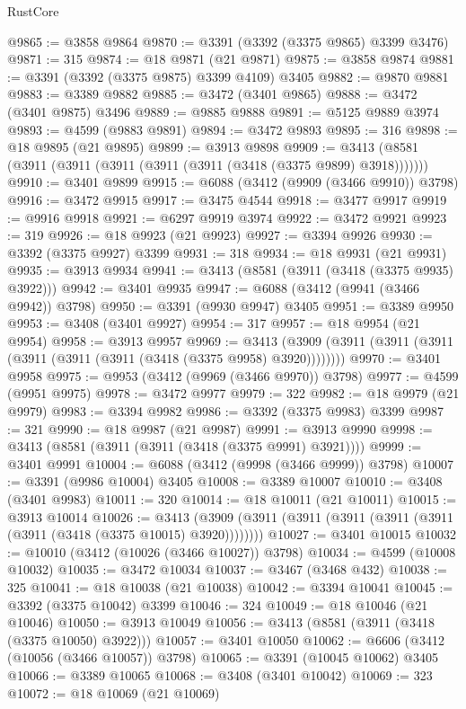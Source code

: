 \begin{lexlean}{RustCore}
\begin{coremodule}
@9865 := @3858 @9864
@9870 := @3391 (@3392 (@3375 @9865) @3399 @3476)
@9871 := 315
@9874 := @18 @9871 (@21 @9871)
@9875 := @3858 @9874
@9881 := @3391 (@3392 (@3375 @9875) @3399 @4109) @3405
@9882 := @9870 @9881
@9883 := @3389 @9882
@9885 := @3472 (@3401 @9865)
@9888 := @3472 (@3401 @9875) @3496
@9889 := @9885 @9888
@9891 := @5125 @9889 @3974
@9893 := @4599 (@9883 @9891)
@9894 := @3472 @9893
@9895 := 316
@9898 := @18 @9895 (@21 @9895)
@9899 := @3913 @9898
@9909 := @3413 (@8581 (@3911 (@3911 (@3911 (@3911 (@3911 (@3418 (@3375 @9899) @3918)))))))
@9910 := @3401 @9899
@9915 := @6088 (@3412 (@9909 (@3466 @9910)) @3798)
@9916 := @3472 @9915
@9917 := @3475 @4544
@9918 := @3477 @9917
@9919 := @9916 @9918
@9921 := @6297 @9919 @3974
@9922 := @3472 @9921
@9923 := 319
@9926 := @18 @9923 (@21 @9923)
@9927 := @3394 @9926
@9930 := @3392 (@3375 @9927) @3399
@9931 := 318
@9934 := @18 @9931 (@21 @9931)
@9935 := @3913 @9934
@9941 := @3413 (@8581 (@3911 (@3418 (@3375 @9935) @3922)))
@9942 := @3401 @9935
@9947 := @6088 (@3412 (@9941 (@3466 @9942)) @3798)
@9950 := @3391 (@9930 @9947) @3405
@9951 := @3389 @9950
@9953 := @3408 (@3401 @9927)
@9954 := 317
@9957 := @18 @9954 (@21 @9954)
@9958 := @3913 @9957
@9969 := @3413 (@3909 (@3911 (@3911 (@3911 (@3911 (@3911 (@3911 (@3418 (@3375 @9958) @3920))))))))
@9970 := @3401 @9958
@9975 := @9953 (@3412 (@9969 (@3466 @9970)) @3798)
@9977 := @4599 (@9951 @9975)
@9978 := @3472 @9977
@9979 := 322
@9982 := @18 @9979 (@21 @9979)
@9983 := @3394 @9982
@9986 := @3392 (@3375 @9983) @3399
@9987 := 321
@9990 := @18 @9987 (@21 @9987)
@9991 := @3913 @9990
@9998 := @3413 (@8581 (@3911 (@3911 (@3418 (@3375 @9991) @3921))))
@9999 := @3401 @9991
@10004 := @6088 (@3412 (@9998 (@3466 @9999)) @3798)
@10007 := @3391 (@9986 @10004) @3405
@10008 := @3389 @10007
@10010 := @3408 (@3401 @9983)
@10011 := 320
@10014 := @18 @10011 (@21 @10011)
@10015 := @3913 @10014
@10026 := @3413 (@3909 (@3911 (@3911 (@3911 (@3911 (@3911 (@3911 (@3418 (@3375 @10015) @3920))))))))
@10027 := @3401 @10015
@10032 := @10010 (@3412 (@10026 (@3466 @10027)) @3798)
@10034 := @4599 (@10008 @10032)
@10035 := @3472 @10034
@10037 := @3467 (@3468 @432)
@10038 := 325
@10041 := @18 @10038 (@21 @10038)
@10042 := @3394 @10041
@10045 := @3392 (@3375 @10042) @3399
@10046 := 324
@10049 := @18 @10046 (@21 @10046)
@10050 := @3913 @10049
@10056 := @3413 (@8581 (@3911 (@3418 (@3375 @10050) @3922)))
@10057 := @3401 @10050
@10062 := @6606 (@3412 (@10056 (@3466 @10057)) @3798)
@10065 := @3391 (@10045 @10062) @3405
@10066 := @3389 @10065
@10068 := @3408 (@3401 @10042)
@10069 := 323
@10072 := @18 @10069 (@21 @10069)

\end{coremodule}
\end{lexlean}
